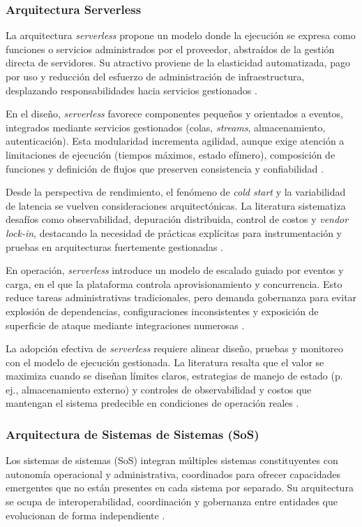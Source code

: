 		\subsubsection{Arquitectura Serverless}
			\noindent
			La arquitectura \textit{serverless} propone un modelo donde la ejecución se expresa como funciones o servicios administrados por el proveedor, abstraídos de la gestión directa de servidores. Su atractivo proviene de la elasticidad automatizada, pago por uso y reducción del esfuerzo de administración de infraestructura, desplazando responsabilidades hacia servicios gestionados \cite{ShafieiEtAl2022Serverless,WenEtAl2023CSUR}.
			
			En el diseño, \textit{serverless} favorece componentes pequeños y orientados a eventos, integrados mediante servicios gestionados (colas, \textit{streams}, almacenamiento, autenticación). Esta modularidad incrementa agilidad, aunque exige atención a limitaciones de ejecución (tiempos máximos, estado efímero), composición de funciones y definición de flujos que preserven consistencia y confiabilidad \cite{ShafieiEtAl2022Serverless}.
			
			Desde la perspectiva de rendimiento, el fenómeno de \textit{cold start} y la variabilidad de latencia se vuelven consideraciones arquitectónicas. La literatura sistematiza desafíos como observabilidad, depuración distribuida, control de costos y \textit{vendor lock-in}, destacando la necesidad de prácticas explícitas para instrumentación y pruebas en arquitecturas fuertemente gestionadas \cite{ShafieiEtAl2022Serverless,WenEtAl2023CSUR}.
			
			En operación, \textit{serverless} introduce un modelo de escalado guiado por eventos y carga, en el que la plataforma controla aprovisionamiento y concurrencia. Esto reduce tareas administrativas tradicionales, pero demanda gobernanza para evitar explosión de dependencias, configuraciones inconsistentes y exposición de superficie de ataque mediante integraciones numerosas \cite{ShafieiEtAl2022Serverless}.
			
			La adopción efectiva de \textit{serverless} requiere alinear diseño, pruebas y monitoreo con el modelo de ejecución gestionada. La literatura resalta que el valor se maximiza cuando se diseñan límites claros, estrategias de manejo de estado (p.\,ej., almacenamiento externo) y controles de observabilidad y costos que mantengan el sistema predecible en condiciones de operación reales \cite{WenEtAl2023CSUR}.
			
		\subsubsection{Arquitectura de Sistemas de Sistemas (SoS)}
			\noindent
			Los sistemas de sistemas (SoS) integran múltiples sistemas constituyentes con autonomía operacional y administrativa, coordinados para ofrecer capacidades emergentes que no están presentes en cada sistema por separado. Su arquitectura se ocupa de interoperabilidad, coordinación y gobernanza entre entidades que evolucionan de forma independiente \cite{SantosEtAl2022CSUR,Fang2022JSyst}.
			
